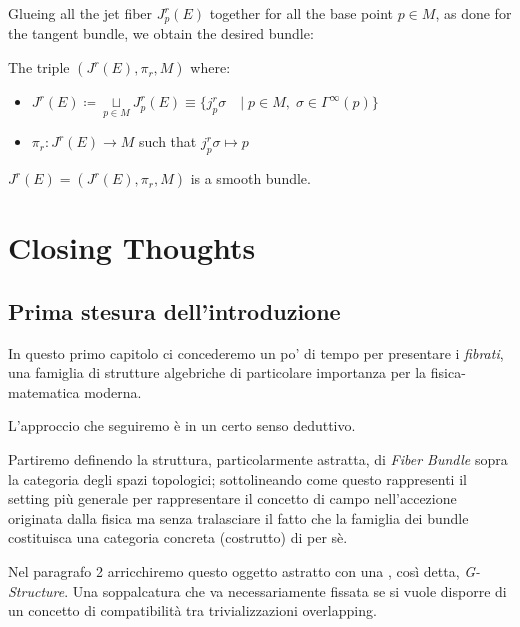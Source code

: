 \documentclass[a4paper,12pt]{scrartcl}    %
\begin{document}
	Glueing all the jet fiber $J^r_p (E)$ together for all the base point $p\in M$, as done for the tangent bundle,  we obtain the desired bundle:
	\begin{definition}
		The triple $(J^r(E), \pi_r, M)$	where:
		\begin{itemize}
			\item $J^r(E) \coloneqq \underset{p \in M}{\sqcup} J^r_p (E)
				 \equiv \big\{j^r_p\sigma \quad \vert \; p\in M, \; \sigma \in \Gamma^\infty(p) \big\}$
			\item $\pi_r: J^r(E) \rightarrow M$ such that $j^{r}_{p}\sigma \mapsto p $
		\end{itemize}
	\end{definition}
	\begin{proposition}
		$ J^r(E) = (J^r(E), \pi_r, M)$ is a smooth bundle.
	\end{proposition}









\newpage
\section{Closing Thoughts}
\subsection{Prima stesura dell'introduzione}
In questo primo capitolo ci concederemo un po' di tempo per presentare i \emph{fibrati}, una famiglia di strutture algebriche di particolare importanza per la fisica-matematica moderna.

L'approccio che seguiremo è in un certo senso deduttivo.

Partiremo definendo la struttura, particolarmente astratta, di \emph{Fiber Bundle} sopra la categoria degli spazi topologici; sottolineando come questo rappresenti il setting più generale per rappresentare il concetto di campo nell'accezione originata dalla fisica ma senza tralasciare il fatto che la famiglia dei bundle costituisca una categoria concreta (costrutto) di per sè.

Nel paragrafo 2 arricchiremo questo oggetto astratto con una , così detta, \emph{G-Structure}. Una soppalcatura che va necessariamente fissata se si vuole disporre di un concetto di compatibilità tra trivializzazioni overlapping.
\end{document}
